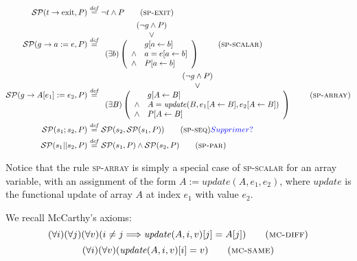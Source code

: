 \documentclass[a4paper,10pt]{article}
\newcommand{\Virginia}[1]{{\color{blue} #1}}
\newcommand{\KWexit}{\ensuremath{\mathrm{exit}}}
\newcommand{\impl}{\ensuremath{\Longrightarrow}}
\newcommand{\update}[3]{\ensuremath{\mathit{update}{(#1,#2,#3)}}\xspace}
\newcommand{\symdef}{\ensuremath{\overset{\mathit{def}}{=}}}
\newcommand{\spexit}{\textsc{sp-exit}\xspace}
\newcommand{\spscalar}{\textsc{sp-scalar}\xspace}
\newcommand{\sparray}{\textsc{sp-array}\xspace}
\newcommand{\spseq}{\textsc{sp-seq}\xspace}
\newcommand{\sppar}{\textsc{sp-par}\xspace}
\newcommand{\mcdiff}{\textsc{mc-diff}\xspace}
\newcommand{\mcsame}{\textsc{mc-same}\xspace}
\begin{document}
\begin{align*}
\spost{t \rightarrow \KWexit}{P} &\symdef \neg t \land P \tag{\spexit}\\
\spost{g \rightarrow a:=e}{P} &\symdef \begin{array}{cl}
(\neg g \land P) \\
\lor \\
(\exists b) \left(\begin{array}{cl}
                         & \subst{g}{a}{b}\\
                    \land& a = \subst{e}{a}{b} \\
                    \land& \subst{P}{a}{b}
                    \end{array}\right)
\end{array} \tag{\spscalar}\\
\spost{g \rightarrow A[e_1]:=e_2}{P} &\symdef \begin{array}{cl}
(\neg g \land P) \\
\lor \\
(\exists B) \left(\begin{array}{cl}
                       & \subst{g}{A}{B}\\
                  \land& A = \update{B}{\subst{e_1}{A}{B}}{\subst{e_2}{A}{B}}\\
                  \land& \subst{P}{A}{B}\\
                  \end{array}\right)
\end{array}\tag{\sparray}\\
\spost{s_1; s_2}{P} &\symdef \spost{s_2}{\spost{s_1}{P}} \tag{\spseq}\Virginia{Supprimer?}\\
\spost{s_1||s_2}{P} &\symdef \spost{s_1}{P}\land\spost{s_2}{P} \tag{\sppar}\\
\end{align*}

Notice that the rule \sparray is simply a special case of \spscalar for an
array variable, with an assignment of the form $A := \update{A}{e_1}{e_2}$,
where $\mathit{update}$ is the functional update of array $A$ at index $e_1$
with value $e_2$.

We recall McCarthy's axioms:
\begin{equation}
(\forall i)(\forall j)(\forall v)(i \neq j \impl \update{A}{i}{v}[j] = A[j])
\tag{\mcdiff}
\end{equation}
\begin{equation}
(\forall i)(\forall v)(\update{A}{i}{v}[i] = v) \tag{\mcsame}
\end{equation}
\end{document}
